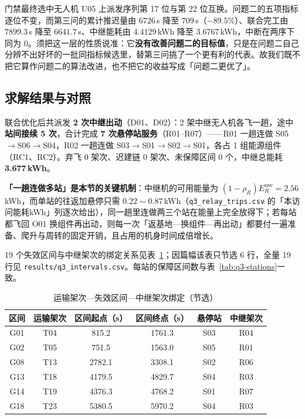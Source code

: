 门禁最终选中无人机 U05 上派发序列第 17 位与第 22 位互换。问题二的五项指标逐位不变，而第三问的累计推迟量由 $6726$\,s 降至 $709$\,s（$-89.5\%$）、联合完工由 $7899.3$\,s 降至 $6641.7$\,s、中继能耗由 $4.4129$\,kWh 降至 $3.6767$\,kWh，中断在两序下同为 $0$。须把这一层的性质说准：它\textbf{没有改善问题二的目标值}，只是在问题二自己分辨不出好坏的一批同指标候选里，替第三问挑了一个更有利的代表。故我们既不把它算作问题二的算法改进，也不把它的收益写成「问题二更优了」。

\subsection{求解结果与对照}

联合优化后共派发 \textbf{2 次中继出动}（D01、D02）：2 架中继无人机各飞一趟，途中\textbf{站间接续 5 次}，合计完成 \textbf{7 次悬停站服务}（R01--R07）——R01 一趟连做 S05$\to$S06$\to$S04，R02 一趟连做 S03$\to$S01$\to$S02$\to$S01，各占 1 组能源组件（RC1、RC2）。弃飞 0 架次、迟建链 0 架次、未保障区间 0 个，中继总能耗 \textbf{3.677\,kWh}。

\textbf{「一趟连做多站」是本节的关键机制}：中继机的可用能量为 $(1-\rho_R)E_R^{\mathrm{use}}=2.56$\,kWh，而单站的往返加悬停只需 $0.22\sim0.87$\,kWh（\texttt{q3\_relay\_trips.csv} 的「本访问能耗kWh」列逐次给出），同一趟里连做两三个站在能量上完全放得下；若每站都飞回 O01 换组件再出动，则每一次「返基地—换组件—再出动」都要付一遍准备、爬升与周转的固定开销，且占用的机身时间成倍增长。

19 个失效区间与中继架次的绑定关系见表~\ref{tab:q3-bind}；因篇幅该表只节选 6 行，全量 19 行见 \texttt{results/q3\_intervals.csv}。每站的保障区间数与表~\ref{tab:q3-stations}一致。

\begin{table}[htbp]
	\caption{运输架次—失效区间—中继架次绑定（节选）}
	\label{tab:q3-bind}
	\centering
	\small
	\begin{tabular}{cccccc}
		\toprule
		区间 & 运输架次 & 区间起点（s） & 区间终点（s） & 悬停站 & 中继架次 \\
		\midrule
		G01 & T04 & 815.2 & 1761.3 & S03 & R04 \\
		G02 & T05 & 751.5 & 1563.0 & S05 & R01 \\
		G08 & T13 & 2782.1 & 3308.1 & S02 & R06 \\
		G13 & T18 & 4179.5 & 4829.7 & S04 & R03 \\
		G14 & T19 & 4376.3 & 4768.2 & S01 & R07 \\
		G18 & T23 & 5380.5 & 5970.2 & S04 & R03 \\
		\bottomrule
	\end{tabular}
\end{table}

